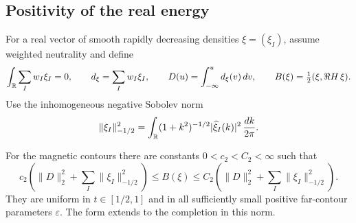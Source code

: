 \subsection{Positivity of the real energy}

For a real vector of smooth rapidly decreasing densities
\(\xi=(\xi_I)\), assume weighted neutrality and define
\[
 \int_{\mathbb R}\sum_Iw_I\xi_I=0,\qquad
 d_\xi=\sum_Iw_I\xi_I,\qquad
 D(u)=\int_{-\infty}^u d_\xi(v)\,dv,\qquad
 B(\xi)=\tfrac12(\xi,\Re H\,\xi).
\]
Use the inhomogeneous negative Sobolev norm
\[
 \|\xi_I\|_{-1/2}^2
 =\int_{\mathbb R}(1+k^2)^{-1/2}|\widehat\xi_I(k)|^2
 \,\frac{dk}{2\pi}.
\]

\begin{theorem}
\label{thm:06-real-positivity}
For the magnetic contours there are constants \(0<c_2<C_2<\infty\)
such that
\begin{equation}
 c_2\left(\|D\|_2^2+\sum_I\|\xi_I\|_{-1/2}^2\right)
 \le B(\xi)\le
 C_2\left(\|D\|_2^2+\sum_I\|\xi_I\|_{-1/2}^2\right).
 \label{eq:06-real-positivity}
\end{equation}
They are uniform in \(t\in[1/2,1]\) and in all sufficiently small
positive far-contour parameters \(\varepsilon\).
The form extends to the completion in this norm.
\end{theorem}

